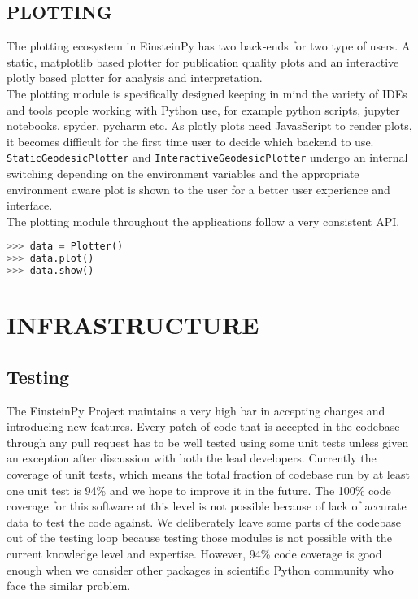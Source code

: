 \documentclass{aastex63}
\begin{document}
\subsection{PLOTTING}
The plotting ecosystem in EinsteinPy has two back-ends for two type of users. A static, matplotlib based plotter for publication quality plots and an interactive plotly based plotter for analysis and interpretation. \\
The plotting module is specifically designed keeping in mind the variety of IDEs and tools people working with Python use, for example python scripts, jupyter notebooks, spyder, pycharm etc. As plotly plots need JavasScript to render plots, it becomes difficult for the first time user to decide which backend to use. \texttt{StaticGeodesicPlotter} and \texttt{InteractiveGeodesicPlotter} undergo an internal switching depending on the environment variables and the appropriate environment aware plot is shown to the user for a better user experience and interface.\\
The plotting module throughout the applications follow a very consistent API. \begin{lstlisting}[language=Python, caption=Plotting Module API]
>>> data = Plotter()
>>> data.plot()
>>> data.show()
\end{lstlisting}


\section{INFRASTRUCTURE} \label{sec:infra}
\subsection{ Testing} \label{subsec:testing}
The EinsteinPy Project maintains a very high bar in accepting changes and introducing new features. Every patch of code that is accepted in the codebase through any pull request has to be well tested using some unit tests unless given an exception after discussion with both the lead developers. Currently the coverage of unit tests, which means the total fraction of codebase run by at least one unit test is 94\% and we hope to improve it in the future. The 100\% code coverage for this software at this level is not possible because of lack of accurate data to test the code against. We deliberately leave some parts of the codebase out of the testing loop because testing those modules is not possible with the current knowledge level and expertise. However, 94\% code coverage is good enough when we consider other packages in scientific Python community who face the similar problem.  
\end{document}
